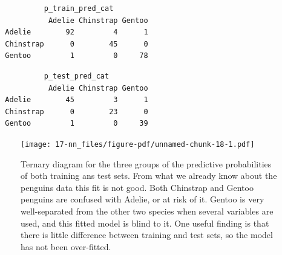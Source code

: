 \documentclass[
  letterpaper,
]{krantz}
\newenvironment{Shaded}{\begin{snugshade}}{\end{snugshade}}
\newcommand{\AttributeTok}[1]{\textcolor[rgb]{0.40,0.45,0.13}{#1}}
\newcommand{\DecValTok}[1]{\textcolor[rgb]{0.68,0.00,0.00}{#1}}
\newcommand{\FunctionTok}[1]{\textcolor[rgb]{0.28,0.35,0.67}{#1}}
\newcommand{\NormalTok}[1]{\textcolor[rgb]{0.00,0.23,0.31}{#1}}
\newcommand{\OtherTok}[1]{\textcolor[rgb]{0.00,0.23,0.31}{#1}}
\newcommand{\SpecialCharTok}[1]{\textcolor[rgb]{0.37,0.37,0.37}{#1}}
\begin{document}
\begin{verbatim}
           p_train_pred_cat
            Adelie Chinstrap Gentoo
  Adelie        92         4      1
  Chinstrap      0        45      0
  Gentoo         1         0     78
\end{verbatim}

\begin{Shaded}
\end{Shaded}

\begin{verbatim}
           p_test_pred_cat
            Adelie Chinstrap Gentoo
  Adelie        45         3      1
  Chinstrap      0        23      0
  Gentoo         1         0     39
\end{verbatim}

\begin{figure}[H]

{\centering \texttt{[image: 17-nn\_files/figure-pdf/unnamed-chunk-18-1.pdf]}

}

\caption{Ternary diagram for the three groups of the predictive
probabilities of both training ans test sets. From what we already know
about the penguins data this fit is not good. Both Chinstrap and Gentoo
penguins are confused with Adelie, or at risk of it. Gentoo is very
well-separated from the other two species when several variables are
used, and this fitted model is blind to it. One useful finding is that
there is little difference between training and test sets, so the model
has not been over-fitted.}

\end{figure}%
\end{document}
